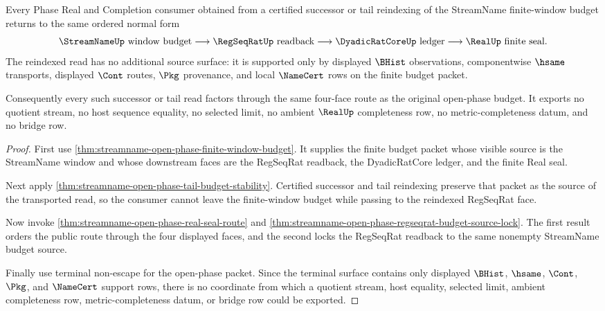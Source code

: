 \begin{theorem}
\label{thm:streamname-open-phase-tail-budget-normal-form}
Every Phase Real and Completion consumer obtained from a certified successor or tail reindexing of the StreamName finite-window budget returns to the same ordered normal form
$$
\StreamNameUp\text{ window budget}\longrightarrow \RegSeqRatUp\text{ readback}\longrightarrow \DyadicRatCoreUp\text{ ledger}\longrightarrow \RealUp\text{ finite seal}.
$$
The reindexed read has no additional source surface: it is supported only by displayed $\BHist$ observations, componentwise $\hsame$ transports, displayed $\Cont$ routes, $\Pkg$ provenance, and local $\NameCert$ rows on the finite budget packet.

Consequently every such successor or tail read factors through the same four-face route as the original open-phase budget. It exports no quotient stream, no host sequence equality, no selected limit, no ambient $\RealUp$ completeness row, no metric-completeness datum, and no bridge row.
\end{theorem}
\begin{proof}
First use \autoref{thm:streamname-open-phase-finite-window-budget}. It supplies the finite budget packet whose visible source is the StreamName window and whose downstream faces are the RegSeqRat readback, the DyadicRatCore ledger, and the finite Real seal.

Next apply \autoref{thm:streamname-open-phase-tail-budget-stability}. Certified successor and tail reindexing preserve that packet as the source of the transported read, so the consumer cannot leave the finite-window budget while passing to the reindexed RegSeqRat face.

Now invoke \autoref{thm:streamname-open-phase-real-seal-route} and \autoref{thm:streamname-open-phase-regseqrat-budget-source-lock}. The first result orders the public route through the four displayed faces, and the second locks the RegSeqRat readback to the same nonempty StreamName budget source.

Finally use terminal non-escape for the open-phase packet. Since the terminal surface contains only displayed $\BHist$, $\hsame$, $\Cont$, $\Pkg$, and $\NameCert$ support rows, there is no coordinate from which a quotient stream, host equality, selected limit, ambient completeness row, metric-completeness datum, or bridge row could be exported.
\end{proof}

